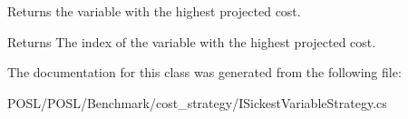 Returns the variable with the highest projected cost. 

\begin{DoxyReturn}{Returns}
The index of the variable with the highest projected cost. 
\end{DoxyReturn}


The documentation for this class was generated from the following file\+:\begin{DoxyCompactItemize}
\item 
P\+O\+S\+L/\+P\+O\+S\+L/\+Benchmark/cost\+\_\+strategy/I\+Sickest\+Variable\+Strategy.\+cs\end{DoxyCompactItemize}
